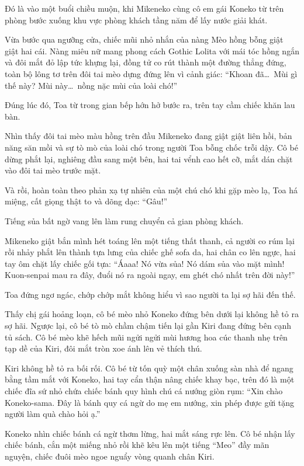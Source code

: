 \documentclass[../main.tex]{subfiles}
\begin{document}
Đó là vào một buổi chiều muộn, khi Mikeneko cùng cô em gái Koneko từ trên phòng bước xuống khu vực phòng khách tầng năm để lấy nước giải khát.

Vừa bước qua ngưỡng cửa, chiếc mũi nhỏ nhắn của nàng Mèo hồng bỗng giật giật hai cái. Nàng miêu nữ mang phong cách Gothic Lolita với mái tóc hồng ngắn và đôi mắt đỏ lập tức khựng lại, đồng tử co rút thành một đường thẳng đứng, toàn bộ lông tơ trên đôi tai mèo dựng đứng lên vì cảnh giác: ``Khoan đã\dots\ Mùi gì thế này? Mùi này\dots\ nồng nặc mùi của loài chó!''

Đúng lúc đó, Toa từ trong gian bếp hớn hở bước ra, trên tay cầm chiếc khăn lau bàn.

Nhìn thấy đôi tai mèo màu hồng trên đầu Mikeneko đang giật giật liên hồi, bản năng săn mồi và sự tò mò của loài chó trong người Toa bỗng chốc trỗi dậy. Cô bé dừng phắt lại, nghiêng đầu sang một bên, hai tai vểnh cao hết cỡ, mắt dán chặt vào đôi tai mèo trước mặt.

Và rồi, hoàn toàn theo phản xạ tự nhiên của một chú chó khi gặp mèo lạ, Toa há miệng, cất giọng thật to và dõng dạc: ``Gâu!''

Tiếng sủa bất ngờ vang lên làm rung chuyển cả gian phòng khách.

Mikeneko giật bắn mình hét toáng lên một tiếng thất thanh, cả người co rúm lại rồi nhảy phắt lên thành tựa lưng của chiếc ghế sofa da, hai chân co lên ngực, hai tay ôm chặt lấy chiếc gối tựa: ``Áaaa! Nó vừa sủa! Nó dám sủa vào mặt mình! Kuon-senpai mau ra đây, đuổi nó ra ngoài ngay, em ghét chó nhất trên đời này!''

Toa đứng ngơ ngác, chớp chớp mắt không hiểu vì sao người ta lại sợ hãi đến thế.

Thấy chị gái hoảng loạn, cô bé mèo nhỏ Koneko đứng bên dưới lại không hề tỏ ra sợ hãi. Ngược lại, cô bé tò mò chầm chậm tiến lại gần Kiri đang đứng bên cạnh tủ sách. Cô bé mèo khẽ hếch mũi ngửi ngửi mùi hương hoa cúc thanh nhẹ trên tạp dề của Kiri, đôi mắt tròn xoe ánh lên vẻ thích thú.

Kiri không hề tỏ ra bối rối. Cô bé từ tốn quỳ một chân xuống sàn nhà để ngang bằng tầm mắt với Koneko, hai tay cẩn thận nâng chiếc khay bạc, trên đó là một chiếc đĩa sứ nhỏ chứa chiếc bánh quy hình chú cá nướng giòn rụm: ``Xin chào Koneko-sama. Đây là bánh quy cá ngừ do mẹ em nướng, xin phép được gửi tặng người làm quà chào hỏi ạ.''

Koneko nhìn chiếc bánh cá ngừ thơm lừng, hai mắt sáng rực lên. Cô bé nhận lấy chiếc bánh, cắn một miếng nhỏ rồi khẽ kêu lên một tiếng ``Meo'' đầy mãn nguyện, chiếc đuôi mèo ngoe nguẩy vòng quanh chân Kiri.
\end{document}
